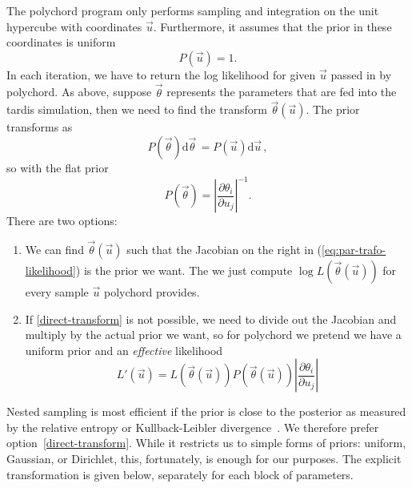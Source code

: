 \documentclass[a4,12pt]{article}
\newcommand{\rmdx}[1]{\mbox{d} #1 \,} %
\newcommand{\vecth}{\ensuremath{{\vec{\theta}}}}
\newcommand{\vecu}{\ensuremath{{\vec{u}}}}
\def \refeq#1{(\ref{eq:#1})}
\begin{document}
The polychord program only performs sampling and integration on the
unit hypercube with coordinates $\vecu$. Furthermore, it assumes that
the prior in these coordinates is uniform
\begin{equation}
  \label{eq:hypercube-prior}
  P(\vecu) = 1.
\end{equation}
In each iteration, we have to return the log likelihood for given
$\vecu$ passed in by polychord.  As above, suppose $\vecth$ represents
the parameters that are fed into the tardis simulation, then we need
to find the transform $\vecth(\vecu)$. The prior transforms as
\begin{equation}
  \label{eq:par-trafo}
  P(\vecth) \rmdx{\vecth} =  P(\vecu) \rmdx{\vecu},
\end{equation}
so with the flat prior
\begin{equation}
  \label{eq:par-trafo-likelihood}
  P(\vecth) = \left| \frac{\partial \theta_i}{\partial u_j} \right|^{-1} .
\end{equation}
There are two options:
\begin{enumerate}
\item \label{direct-transform} We can find $\vecth(\vecu)$ such that
  the Jacobian on the right in \refeq{par-trafo-likelihood} is the
  prior we want. The we just compute $\log L(\vecth(\vecu))$ for every
  sample $\vecu$ polychord provides.
\item If \ref{direct-transform} is not possible, we need to divide
  out the Jacobian and multiply by the actual prior we want, so for
  polychord we pretend we have a uniform prior and an \emph{effective} likelihood
  \begin{equation}
    \label{eq:eff-likelihood}
    L'(\vecu) = L(\vecth(\vecu)) P(\vecth(\vecu)) \left| \frac{\partial \theta_i}{\partial u_j} \right|
  \end{equation}
\end{enumerate}
Nested sampling is most efficient if the prior is close to the
posterior as measured by the relative entropy or Kullback-Leibler
divergence~\cite{skilling_nested_2006}. We therefore prefer
option~\ref{direct-transform}. While it restricts us to simple forms
of priors: uniform, Gaussian, or Dirichlet, this, fortunately, is
enough for our purposes. The explicit transformation is given below,
separately for each block of parameters.

\end{document}
